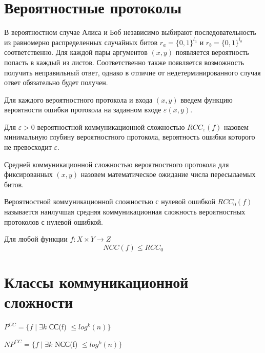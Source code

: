 \documentclass[12pt]{article}
\begin{document}
\section{Вероятностные протоколы}
В вероятностном случае Алиса и Боб независимо выбирают последовательность из равномерно распределенных случайных битов
$r_a=\{0, 1\}^{l_a}$ и $r_b=\{0, 1\}^{l_b}$ соответственно. Для каждой пары аргументов $(x,y)$ появляется вероятность попасть в каждый из листов. Соответственно также появляется возможность получить неправильный ответ, однако в отличие от недетерминированного случая ответ обязательно будет получен.

\begin{Def}
Для каждого вероятностного протокола и входа $(x,y)$ введем функцию вероятности ошибки протокола на заданном входе $\varepsilon(x,y)$.
\end{Def}

\begin{Def}
Для $\varepsilon>0$ вероятностной коммуникационной сложностью
$RCC_{\varepsilon}(f)$ назовем
минимальную глубину вероятностного протокола, вероятность ошибки которого не превосходит $\varepsilon$.
\end{Def}

\begin{Def}
Средней коммуникационной сложностью вероятностного протокола для фиксированных $(x, y)$ назовем математическое ожидание числа пересылаемых битов.
\end{Def}

\begin{Def}
Вероятностной коммуникационной сложностью с нулевой ошибкой
$RCC_0(f)$ называется наилучшая средняя коммуникационная сложность
вероятностных протоколов с нулевой ошибкой.
\end{Def}

\begin{Statement}
    Для любой функции $f \colon X \times Y \rightarrow Z$
    $$NCC(f) \leq RCC_0$$
\end{Statement}

\section{Классы коммуникационной сложности}
\begin{Def}
    $P^{CC} = \{f \; | \; \exists k $ СС(f) $\leq log^k(n)\}$
\end{Def}

\begin{Def}
    $NP^{CC} = \{f \; | \; \exists k$ NСС(f) $\leq log^k(n)\}$
\end{Def}
\end{document}
